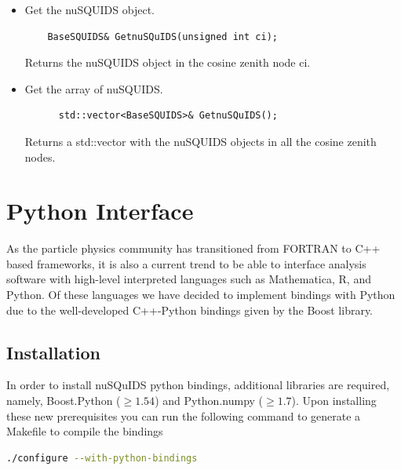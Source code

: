\documentclass[3p,12pt]{elsarticle}
\newcommand{\ttf}{\ttfamily}
\begin{document}
\begin{itemize}
\item Get the nuSQUIDS object.
  \begin{lstlisting}
    BaseSQUIDS& GetnuSQuIDS(unsigned int ci);
  \end{lstlisting}
  Returns the nuSQUIDS object in the cosine zenith node {\ttf ci}.

\item Get the array of nuSQUIDS.
  \begin{lstlisting}
      std::vector<BaseSQUIDS>& GetnuSQuIDS();
    \end{lstlisting}
    Returns a {\ttf std::vector} with the nuSQUIDS objects in all the
    cosine zenith nodes.
\end{itemize}

\section{Python Interface}
\label{sec:python}

As the particle physics community has transitioned from {\ttfamily FORTRAN} to {\ttfamily C++} based frameworks, 
it is also a current trend to be able to interface analysis software with high-level interpreted 
languages such as {\ttfamily Mathematica}, {\ttfamily R}, and {\ttfamily Python}. 
Of these languages we have decided to implement bindings with Python due to the well-developed 
{\ttfamily C++}-{\ttfamily Python} bindings given by the {\ttfamily Boost} library.

\subsection{Installation}

In order to install nuSQuIDS python bindings, additional libraries are required, namely, {\ttfamily Boost.Python} ($\ge1.54$) and {\ttfamily Python.numpy} ($\ge1.7$). 
Upon installing these new prerequisites you can run the following command to generate a Makefile to compile the bindings

\begin{lstlisting}[language=Bash]
./configure --with-python-bindings
\end{lstlisting}
\end{document}
